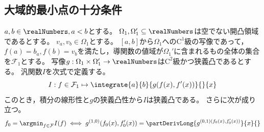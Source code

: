         \subsection{大域的最小点の十分条件}
            \label{汎関数の大域的最小点の十分条件}
            \begin{shadebox}
                $a,b\in\realNumbers,a<b$とする。
                $\Omega_1,\Omega_1'\subseteq\realNumbers$は空でない開凸領域であるとする。
                $v_a,v_b\in\Omega_1$とする。
                $[a,b]$から$\Omega_1$への$\mathrm{C}^1$級の写像であって，$f(a)=b_a,f(b)=v_b$を満たし，導関数の値域が$\Omega_1'$に含まれるもの全体の集合を$\mathcal{F}_1$とする。
                写像$g:\Omega_1\times\Omega_1'\to\realNumbers$は$\mathrm{C}^2$級かつ狭義凸であるとする。
                汎関数$I$を次式で定義する。
                \[I: f\in\mathcal{F}_1 \mapsto \integrate{a}{b}{g(f(x),f'(x))}{}{x}\]
                このとき，積分の線形性と$g$の狭義凸性から$I$は狭義凸である。
                さらに次が成り立つ。
                \[ f_0 = \argmin_{f\in\mathcal{F}}I(f) \iff g^{(1,0)}(f_0(x),f_0'(x)) = \partDerivLong{g^{(0,1)(f_0(x),f_0'(x))}}{x}{} \]
            \end{shadebox}

